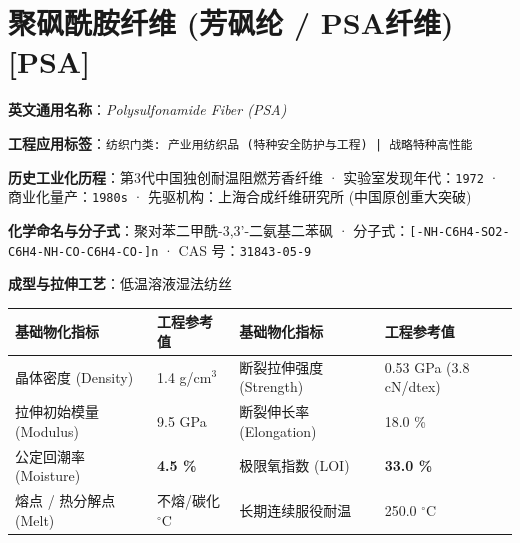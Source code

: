 \documentclass[11pt,openright,twoside,UTF8]{ctexbook}
\begin{document}
\section{聚砜酰胺纤维 (芳砜纶 / PSA纤维) [PSA]}
\label{sec:psa}

\noindent\textbf{英文通用名称}：\textit{Polysulfonamide Fiber (PSA)}\par
\noindent\textbf{工程应用标签}：\texttt{纺织门类: 产业用纺织品 (特种安全防护与工程) | 战略特种高性能}\par
\noindent\textbf{历史工业化历程}：第3代中国独创耐温阻燃芳香纤维 · 实验室发现年代：\texttt{1972} · 商业化量产：\texttt{1980s} · 先驱机构：上海合成纤维研究所 (中国原创重大突破)\par
\noindent\textbf{化学命名与分子式}：聚对苯二甲酰-3,3'-二氨基二苯砜 · 分子式：\texttt{[-NH-C6H4-SO2-C6H4-NH-CO-C6H4-CO-]n} · CAS 号：\texttt{31843-05-9}\par
\noindent\textbf{成型与拉伸工艺}：低温溶液湿法纺丝\par

\vspace{0.15cm}
\begin{center}
\small
\begin{tabularx}{\textwidth}{p{3.8cm}Xp{3.8cm}X}
\toprule
\textbf{基础物化指标} & \textbf{工程参考值} & \textbf{基础物化指标} & \textbf{工程参考值} \\
\midrule
晶体密度 (Density) & 1.4 g/cm$^3$ & 断裂拉伸强度 (Strength) & 0.53 GPa (3.8 cN/dtex) \\
拉伸初始模量 (Modulus) & 9.5 GPa & 断裂伸长率 (Elongation) & 18.0 \% \\
公定回潮率 (Moisture) & \textbf{4.5 \%} & 极限氧指数 (LOI) & \textbf{33.0 \%} \\
熔点 / 热分解点 (Melt) & 不熔/碳化 $^\circ\mathrm{C}$ & 长期连续服役耐温 & 250.0 $^\circ\mathrm{C}$ \\
\bottomrule
\end{tabularx}
\end{center}
\vspace{0.15cm}
\end{document}
